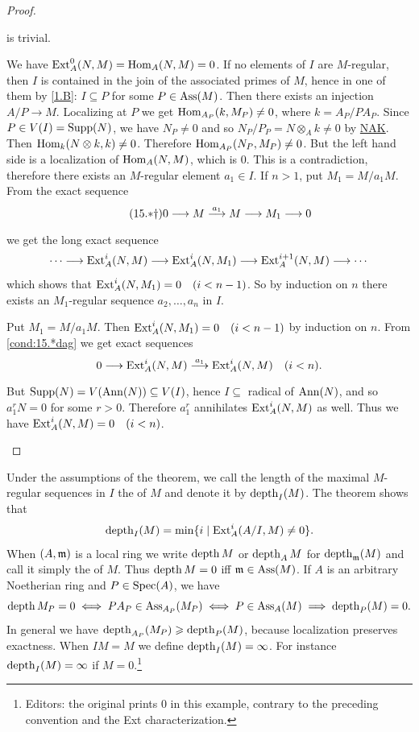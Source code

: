\documentclass[../main]{subfiles}
\begin{document}
\begin{proof}\phantom{,}
\begin{implyenumerate}
    \item[$(1)\implies(2)\implies(3)$] is trivial.
    \item[$(3)\implies(4)$]We have $\operatorname{Ext}_A^0(N, M)=\operatorname{Hom}_A(N, M)=0$. If no elements of $I$ are $M$-regular, then $I$ is contained in the join of the associated primes of $M$, hence in one of them by \ref{1.B}: $I\subseteq P$ for some $P \in \operatorname{Ass}(M)$. Then there exists an injection $A / P \longrightarrow M$. Localizing at $P$ we get $\operatorname{Hom}_{A_P}(k, M_P) \neq 0$, where $k=A_P/PA_P$. Since $P \in V(I)=\operatorname{Supp}(N)$, we have $N_P \neq 0$ and so $N_P / P_P=N \otimes_A k \neq 0$ by \hyperref[NAK]{NAK}. Then $\operatorname{Hom}_k(N \otimes k, k) \neq 0$. Therefore $\operatorname{Hom}_{A_P}(N_P, M_P) \neq0$. But the left hand side is a localization of $\operatorname{Hom}_A(N, M)$, which is $0$. This is a contradiction, therefore there exists an $M$-regular element $a_1 \in I$. If $n>1$, put $M_1=M / a_1 M$. From the exact sequence
    \[\tag{15.$\ast \dagger$} \label{cond:15.*dag}0\longrightarrow M\varrightarrow{a_1}M\longrightarrow M_1\longrightarrow 0
    \]
    we get the long exact sequence \[\cdots\longrightarrow\operatorname{Ext}_A^i(N, M)\longrightarrow\operatorname{Ext}_A^i(N, M_1) \longrightarrow \operatorname{Ext}_A^{i+1}(N, M) \longrightarrow \cdots\] which shows that $\Ext_A^i(N, M_1)=0\for{i<n-1}$. So by induction on $n$ there exists an $M_1$-regular sequence $a_2, \ldots, a_n$ in $I$.
    \item[$(4)\implies(1)$] Put $M_1=M / a_1 M$. Then $\Ext_A^i(N, M_1)=0\for{i<n-1}$ by induction on $n$. From \ref{cond:15.*dag} we get exact sequences \[0 \longrightarrow \Ext_A^i(N, M) \varrightarrow{a_1}\Ext_{A}^{i}(N, M)\quad(i<n).\] But $\operatorname{Supp}(N)=V(\operatorname{Ann}(N)) \subseteq V(I)$, hence $I \subseteq$ radical of $\operatorname{Ann}(N)$, and so $a_1^r N=0$ for some $r>0$. Therefore $a_1^r$ annihilates $\operatorname{Ext}_A^i(N, M)$ as well. Thus we have $\Ext_A^i(N, M)=0\for{i<n}$.
\end{implyenumerate}
\end{proof}

Under the assumptions of the theorem, we call the length of the maximal $M$-regular sequences in $I$ the  of $M$ and denote it by $\operatorname{depth}_I(M)$. The theorem shows that \[\operatorname{depth}_I(M)=\min \{i \mid \operatorname{Ext}_A^i(A / I, M) \neq 0\}.\] When $(A,\mathfrak{m})$ is a local ring we write $\operatorname{depth} M$ or $\operatorname{depth}_AM$ for $\operatorname{depth}_{\mathfrak{m}}(M)$ and call it simply the  of $M$. Thus $\operatorname{depth} M=0$ iff $\mathfrak{m} \in \operatorname{Ass}(M)$. If $A$ is an arbitrary Noetherian ring and $P \in \operatorname{Spec}(A)$, we have \[\operatorname{depth} M_P=0 \iff P A_P \in\operatorname{Ass}_{A_P}(M_P) \iff P \in\operatorname{Ass}_A(M)\implies \operatorname{depth}_P(M)=0.\] In general we have $\operatorname{depth}_{A_P}(M_P) \geqslant \operatorname{depth}_P(M)$, because localization preserves exactness. When $I M=M$ we define $\operatorname{depth}_I(M)=\infty$. For instance $\operatorname{depth}_I(M)=\infty$ if $M=0$.\footnote{Editors: the original prints $0$ in this example, contrary to the preceding convention and the Ext characterization.}
\end{document}
